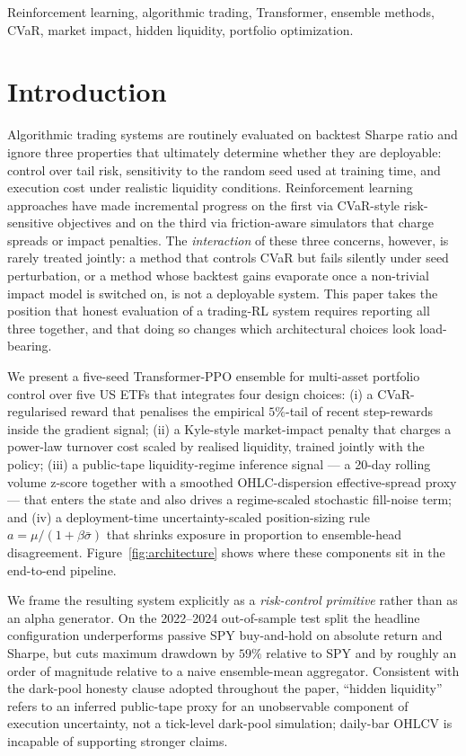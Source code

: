 \documentclass[conference]{IEEEtran}
\begin{document}
\begin{IEEEkeywords}
Reinforcement learning, algorithmic trading, Transformer, ensemble methods,
CVaR, market impact, hidden liquidity, portfolio optimization.
\end{IEEEkeywords}

\section{Introduction}
\label{sec:intro}
Algorithmic trading systems are routinely evaluated on backtest Sharpe
ratio and ignore three properties that ultimately determine whether
they are deployable: control over tail risk, sensitivity to the random
seed used at training time, and execution cost under realistic
liquidity conditions. Reinforcement learning approaches have made
incremental progress on the first via CVaR-style risk-sensitive
objectives and on the third via friction-aware simulators that charge
spreads or impact penalties. The \emph{interaction} of these three
concerns, however, is rarely treated jointly: a method that controls
CVaR but fails silently under seed perturbation, or a method whose
backtest gains evaporate once a non-trivial impact model is switched
on, is not a deployable system. This paper takes the position that
honest evaluation of a trading-RL system requires reporting all three
together, and that doing so changes which architectural choices look
load-bearing.

We present a five-seed Transformer-PPO ensemble for multi-asset
portfolio control over five US ETFs that integrates four design
choices: (i) a CVaR-regularised reward that penalises the empirical
$5\%$-tail of recent step-rewards inside the gradient signal;
(ii) a Kyle-style market-impact penalty that charges a power-law
turnover cost scaled by realised liquidity, trained jointly with the
policy; (iii) a public-tape liquidity-regime inference signal --- a
20-day rolling volume z-score together with a smoothed
OHLC-dispersion effective-spread proxy --- that enters the state and
also drives a regime-scaled stochastic fill-noise term; and
(iv) a deployment-time uncertainty-scaled position-sizing rule
$a = \mu / (1 + \beta\bar\sigma)$ that shrinks exposure in proportion
to ensemble-head disagreement. Figure~\ref{fig:architecture} shows
where these components sit in the end-to-end pipeline.

We frame the resulting system explicitly as a \emph{risk-control
primitive} rather than as an alpha generator. On the 2022--2024
out-of-sample test split the headline configuration underperforms
passive SPY buy-and-hold on absolute return and Sharpe, but cuts
maximum drawdown by $59\%$ relative to SPY and by roughly an order of
magnitude relative to a naive ensemble-mean aggregator. Consistent
with the dark-pool honesty clause adopted throughout the paper,
``hidden liquidity'' refers to an inferred public-tape proxy for an
unobservable component of execution uncertainty, not a tick-level
dark-pool simulation; daily-bar OHLCV is incapable of supporting
stronger claims.
\end{document}

